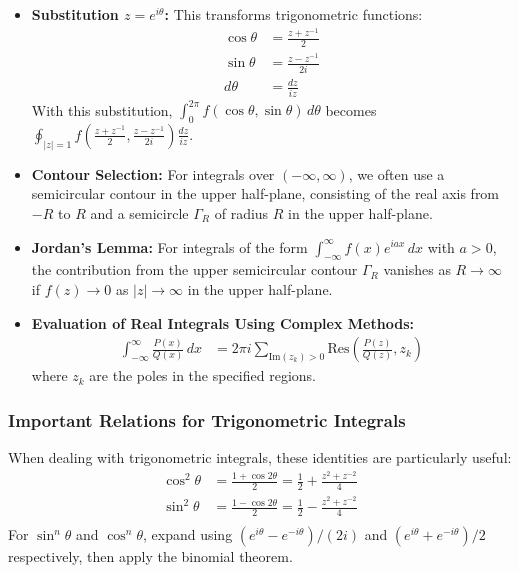 \begin{itemize}
    \item \textbf{Substitution $z = e^{i\theta}$:} This transforms trigonometric functions:
    \begin{align*}
        \cos\theta &= \frac{z + z^{-1}}{2} \\
        \sin\theta &= \frac{z - z^{-1}}{2i} \\
        d\theta &= \frac{dz}{iz}
    \end{align*}
    With this substitution, $\int_{0}^{2\pi} f(\cos\theta, \sin\theta) \, d\theta$ becomes $\oint_{|z|=1} f\left(\frac{z + z^{-1}}{2}, \frac{z - z^{-1}}{2i}\right) \frac{dz}{iz}$.
    
    \item \textbf{Contour Selection:} For integrals over $(-\infty, \infty)$, we often use a semicircular contour in the upper half-plane, consisting of the real axis from $-R$ to $R$ and a semicircle $\Gamma_R$ of radius $R$ in the upper half-plane.
    
    \item \textbf{Jordan's Lemma:} For integrals of the form $\int_{-\infty}^{\infty} f(x)e^{iax} \, dx$ with $a > 0$, the contribution from the upper semicircular contour $\Gamma_R$ vanishes as $R \to \infty$ if $f(z) \to 0$ as $|z| \to \infty$ in the upper half-plane.
    
    \item \textbf{Evaluation of Real Integrals Using Complex Methods:}
    \begin{align*}
        \int_{-\infty}^{\infty} \frac{P(x)}{Q(x)} \, dx &= 2\pi i \sum_{\text{Im}(z_k) > 0} \text{Res}\left(\frac{P(z)}{Q(z)}, z_k\right)
    \end{align*}
    where $z_k$ are the poles in the specified regions.
\end{itemize}

\subsubsection*{Important Relations for Trigonometric Integrals}

\noindent When dealing with trigonometric integrals, these identities are particularly useful:
\begin{align*}
    \cos^2\theta &= \frac{1 + \cos 2\theta}{2} = \frac{1}{2} + \frac{z^2 + z^{-2}}{4} \\
    \sin^2\theta &= \frac{1 - \cos 2\theta}{2} = \frac{1}{2} - \frac{z^2 + z^{-2}}{4} \\
\end{align*}
For $\sin^n\theta$ and $\cos^n\theta$, expand using $(e^{i\theta} - e^{-i\theta})/(2i)$ and $(e^{i\theta} + e^{-i\theta})/2$ respectively, then apply the binomial theorem.

